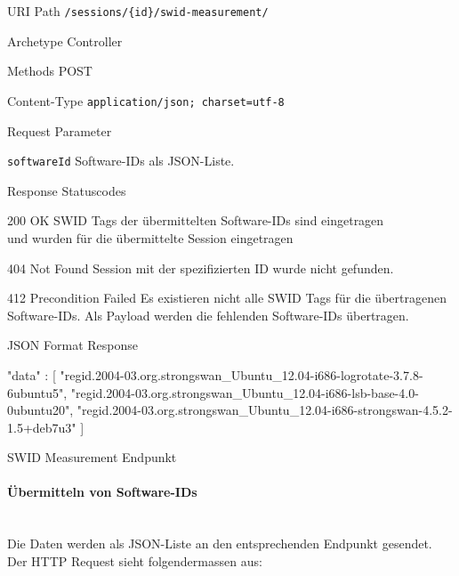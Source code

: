 \begin{listing}[H]
\begin{mdframed}[style=def]
\begin{description*}
	\item[URI Path] \texttt{/sessions/\{id\}/swid-measurement/}
	\item[Archetype] Controller
	\item[Methods] POST
	\item[Content-Type] \texttt{application/json; charset=utf-8}
	\item[Request Parameter] \hfill
	\begin{description*}
		\item[\texttt{softwareId}] Software-IDs als JSON-Liste.
	\end{description*}
	\item[Response Statuscodes] \hfill
		\begin{description*}
			\item[200 OK] SWID Tags der übermittelten Software-IDs sind eingetragen \\
				und wurden für die übermittelte Session eingetragen
			\item[404 Not Found] Session mit der spezifizierten ID wurde nicht gefunden. 
			\item[412 Precondition Failed] Es existieren nicht alle SWID Tags für die
				übertragenen Software-IDs. Als Payload werden die fehlenden Software-IDs
				übertragen.
		\end{description*}
	\item[JSON Format Response] \hfill
	
\begin{jsoncode}
{"data" : 
	[
		"regid.2004-03.org.strongswan_Ubuntu_12.04-i686-logrotate-3.7.8-6ubuntu5",
		"regid.2004-03.org.strongswan_Ubuntu_12.04-i686-lsb-base-4.0-0ubuntu20",
		"regid.2004-03.org.strongswan_Ubuntu_12.04-i686-strongswan-4.5.2-1.5+deb7u3" 
	]
}
\end{jsoncode}
\end{description*}
\end{mdframed}
\caption{SWID Measurement Endpunkt}
\end{listing}

\paragraph{Übermitteln von Software-IDs} \hspace{0pt} \\
Die Daten werden als JSON-Liste an den entsprechenden Endpunkt gesendet.
Der HTTP Request sieht folgendermassen aus:

